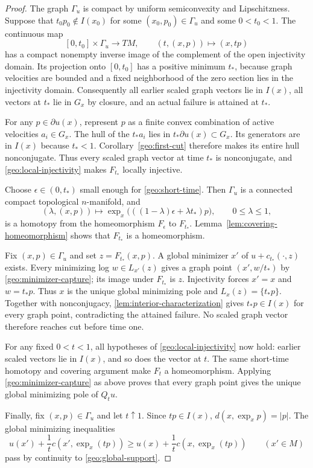 \begin{proof}
The graph $\Gamma_u$ is compact by uniform semiconvexity and
Lipschitzness. Suppose that $t_0p_0\notin I(x_0)$ for some
$(x_0,p_0)\in\Gamma_u$ and some $0<t_0<1$. The continuous map
\[
 [0,t_0]\times\Gamma_u\longrightarrow TM,\qquad
 (t,(x,p))\longmapsto(x,tp)
\]
has a compact nonempty inverse image of the complement of the open
injectivity domain. Its projection onto $[0,t_0]$ has a positive
minimum $t_*$, because graph velocities are bounded and a fixed
neighborhood of the zero section lies in the injectivity domain.
Consequently all earlier scaled graph vectors lie in $I(x)$,
all vectors at $t_*$ lie in $G_x$ by closure, and an actual failure
is attained at $t_*$.

For any $p\in\partial u(x)$, represent $p$ as a finite convex
combination of active velocities $a_i\in G_x$. The hull of the
$t_*a_i$ lies in $t_*\partial u(x)\subset G_x$. Its generators are
in $I(x)$ because $t_*<1$. Corollary~\ref{geo:first-cut} therefore
makes its entire hull nonconjugate. Thus every scaled graph vector
at time $t_*$ is nonconjugate, and
\cref{geo:local-injectivity} makes $F_{t_*}$ locally injective.

Choose $\epsilon\in(0,t_*)$ small enough for
\cref{geo:short-time}. Then $\Gamma_u$ is a connected compact
topological $n$-manifold, and
\[
 (\lambda,(x,p))\longmapsto
 \exp_x\bigl(((1-\lambda)\epsilon+\lambda t_*)p\bigr),
 \qquad 0\leq\lambda\leq1,
\]
is a homotopy from the homeomorphism $F_\epsilon$ to $F_{t_*}$.
Lemma~\ref{lem:covering-homeomorphism} shows that $F_{t_*}$ is a
homeomorphism.

Fix $(x,p)\in\Gamma_u$ and set $z=F_{t_*}(x,p)$. A global minimizer
$x'$ of $u+c_{t_*}(\cdot,z)$ exists. Every minimizing log
$w\in L_{x'}(z)$ gives a graph point $(x',w/t_*)$ by
\cref{geo:minimizer-capture}; its image under $F_{t_*}$ is $z$.
Injectivity forces $x'=x$ and $w=t_*p$. Thus $x$ is the unique
global minimizing pole and $L_x(z)=\{t_*p\}$. Together with
nonconjugacy, \cref{lem:interior-characterization} gives
$t_*p\in I(x)$ for every graph point, contradicting the attained
failure. No scaled graph vector therefore reaches cut before time one.

For any fixed $0<t<1$, all hypotheses of
\cref{geo:local-injectivity} now hold: earlier scaled vectors lie in
$I(x)$, and so does the vector at $t$. The same short-time homotopy
and covering argument make $F_t$ a homeomorphism. Applying
\cref{geo:minimizer-capture} as above proves that every graph point
gives the unique global minimizing pole of $Q_tu$.

Finally, fix $(x,p)\in\Gamma_u$ and let $t\uparrow1$.
Since $tp\in I(x)$,
$d(x,\exp_xp)=|p|$. The global minimizing inequalities
\[
 u(x')+\frac1t c(x',\exp_x(tp))
 \geq u(x)+\frac1t c(x,\exp_x(tp))
 \qquad(x'\in M)
\]
pass by continuity to \eqref{geo:global-support}.
\end{proof}


